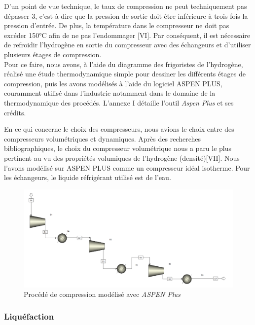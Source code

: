\documentclass[11pt,french,a4paper]{article}
\begin{document}
D'un point de vue technique, le taux de compression ne peut techniquement pas dépasser 3, c'est-à-dire que la pression de sortie doit être inférieure à trois fois la pression d'entrée. De plus, la température dans le compresseur ne doit pas excéder 150°C afin de ne pas l'endommager [VI]. Par conséquent, il est nécessaire de refroidir l'hydrogène en sortie du compresseur avec des échangeurs et d'utiliser plusieurs étages de compression. \\

Pour ce faire, nous avons, à l’aide du diagramme des frigoristes de l’hydrogène, réalisé une étude thermodynamique simple pour dessiner les différents étages de compression, puis les avons modélisés à l’aide du logiciel ASPEN PLUS, couramment utilisé dans l'industrie notamment dans le domaine de la thermodynamique des procédés. L'annexe I détaille l'outil \textit{Aspen Plus} et ses crédits.

En ce qui concerne le choix des compresseurs, nous avions le choix entre des compresseurs volumétriques et dynamiques. Après des recherches bibliographiques, le choix du compresseur volumétrique nous a paru le plus pertinent au vu des propriétés volumiques de l’hydrogène (densité)[VII]. Nous l’avons modélisé sur ASPEN PLUS comme un compresseur idéal isotherme. Pour les échangeurs, le liquide réfrigérant utilisé est de l’eau. \\

\begin{figure}[h!]
 \centering
 \includegraphics[width=.8\linewidth]{image/chap3/etage_compression.PNG}
 \caption{Procédé de compression modélisé avec \textit{ASPEN Plus} }
\end{figure}





\subsubsection{Liquéfaction}
\end{document}

